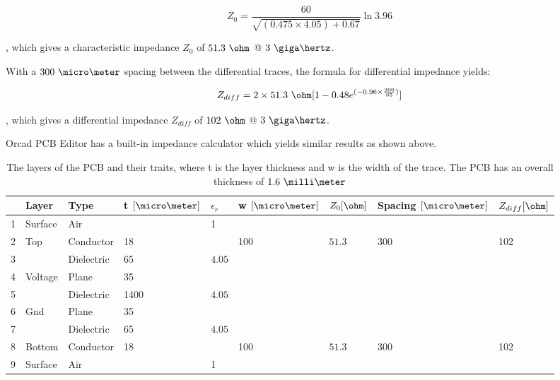 \documentclass[main.tex]{subfiles}
\begin{document}
\begin{equation}
Z_0 = \frac{60}{\sqrt{(0.475 \times 4.05) + 0.67}}\ln{3.96}
\end{equation}

, which gives a characteristic impedance $Z_0$ of $51.3\ \ohm$ @ $3\ \giga\hertz$. 

With a $300\ \micro\meter$ spacing between the differential traces, the formula for differential impedance yields:

\begin{equation}
    Z_{diff} = 2 \times 51.3\ \ohm [1 - 0.48 e^{(-0.96 \times \frac{300}{65})}]
  \label{eq:zdiff}
\end{equation}

, which gives a differential impedance $Z_{diff}$ of $102\ \ohm$ @ $3\ \giga\hertz$.


Orcad PCB Editor has a built-in impedance calculator which yields similar results as shown above.

\begin{table} [ht]
\begin{center}
    \begin{tabular}{| l | l | l | l | l | l | l | l | l |}
    \hline
     & Layer & Type & t $[\micro\meter]$ & $\epsilon_r$ & w $[\micro\meter]$  & $Z_0 [\ohm]$ & Spacing $[\micro\meter]$  & $Z_{diff} [\ohm]$ \\ 
     \hline
    1 	  & Surface & Air 		 & 		& 1 	 & 	   & 					& 	  & \\ \hline
    2 	  & Top 	& Conductor  & 18 	&        & 100 & $51.3$             & 300 & 102\\ \hline
    3 	  &  		& Dielectric & 65 	& $4.05$ & 	   & 					& 	  & \\ \hline
    4 	  & Voltage & Plane 	 & 35 	&        & 	   & 					& 	  & \\ \hline
    5 	  &  		& Dielectric & 1400 & $4.05$ & 	   &					&	  & \\ \hline
    6 	  & Gnd 	& Plane 	 & 35 	&        & 	   & 					& 	  & \\ \hline
    7 	  &  		& Dielectric & 65 	& $4.05$ &     & 					& 	  & \\ \hline
    8 	  & Bottom 	& Conductor  & 18 	&        & 100 & $51.3$             & 300 & 102\\ \hline
    9 	  & Surface & Air 		 & 	  	& 1 	 & 	   & 					& 	  & \\ \hline
    \end{tabular}
     \caption{The layers of the PCB and their traits, where t is the layer thickness and w is the width of the trace. The PCB has an overall thickness of $1.6\ \milli\meter$}
	\label{tab:Xsect1}
\end{center}
\end{table}
\end{document}
